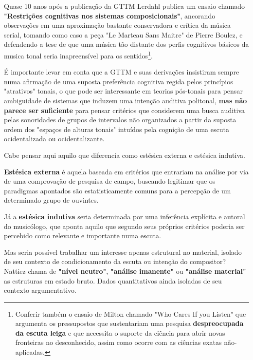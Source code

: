 \documentclass[
	12pt,				%
	openright,			%
	twoside,			%
	a4paper,			%
	english,			%
	french,				%
	spanish,			%
	brazil				%
	]{abntex2}
\begin{document}
Quase 10 anos após a publicação da GTTM Lerdahl publica um ensaio chamado \textbf{"Restrições cognitivas nos sistemas composicionais"}\cite{lerdahl1992cognitive}, ancorando observações em uma aproximação bastante conservadora e crítica da música serial, tomando como caso a peça "Le Marteau Sans Maitre" de Pierre Boulez, e defendendo a tese de que uma música tão distante dos perfis cognitivos básicos da musica tonal seria inapreensível para os sentidos\footnote{Conferir também o ensaio de Milton  chamado "Who Cares If you Listen" que argumenta os pressupostos que sustentariam uma pesquisa \textbf{despreocupada da escuta leiga} e que necessita o suporte da ciência para abrir novas fronteiras no desconhecido, assim como ocorre com as ciências exatas não-aplicadas. }. 

É importante levar em conta que a GTTM e suas derivações insistiram sempre numa afirmação de uma suposta preferência cognitiva regida pelos princípios "atrativos" tonais, o que pode ser interessante em teorias pós-tonais para pensar ambiguidade de sistemas que induzem uma intenção auditiva politonal, \textbf{mas não parece ser suficiente }para pensar critérios que considerem uma busca auditiva pelas sonoridades de grupos de intervalos não organizados a partir da suposta ordem dos "espaços de alturas tonais"\cite{lerdahl1988tps} intuídos pela cognição de uma escuta ocidentalizada ou ocidentalizante.

Cabe pensar aqui aquilo que  diferencia como estésica externa e estésica indutiva. 

\textbf{Estésica externa} é aquela baseada em critérios que entrariam na análise por via de uma comprovação de pesquisa de campo, buscando legitimar que os paradigmas apontados são estatisticamente comuns para a percepção de um determinado grupo de ouvintes. 

Já a \textbf{estésica indutiva} seria determinada por uma inferência explícita e autoral do musicólogo, que aponta aquilo que segundo seus próprios critérios poderia ser percebido como relevante e importante numa escuta. 

Mas seria possível trabalhar um interesse apenas estrutural no material, isolado de seu contexto de condicionamento da escuta ou intenção do compositor? Nattiez chama de \textbf{"nível neutro"}, \textbf{"análise imanente"} ou \textbf{"análise material"} as estruturas em estado bruto. Dados quantitativos ainda isoladas de seu contexto argumentativo. 
\end{document}
